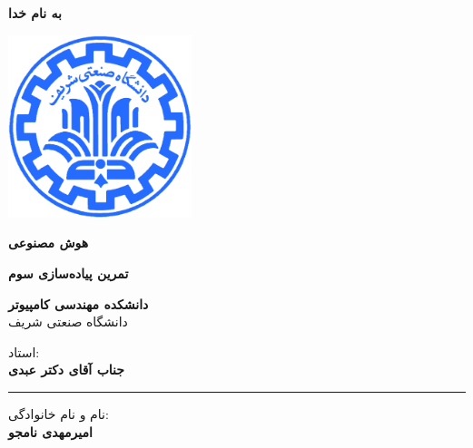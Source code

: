 \documentclass[12pt,titlepage,a4page , tikz , multi,table , svgnames,xcdraw]{article}
\begin{document}
\begin{titlepage}

 \begin{center}
        
       \vspace*{1cm}

 \vspace{1cm}
       \textbf{ \Huge{به نام خدا} }
       \vspace{0.4cm}
       
       \includegraphics[width=0.4\textwidth]{sharif1.png}
       
 	\vspace{0.7cm}
       \textbf{ \LARGE{هوش مصنوعی} }

 
   \vspace{0.7cm}
  \textbf{ \Large{ تمرین پیاده‌سازی سوم} }
   \vspace{0.5cm}
       
 
      \large \textbf{دانشکده مهندسی کامپیوتر}\\\vspace{0.2cm}
    \large   دانشگاه صنعتی شریف\\\vspace{0.25cm}
      
استاد:\\
    \textbf{{جناب آقای دکتر عبدی}}

    \vspace{0.25cm}
    \noindent\rule[1ex]{\linewidth}{3pt}
    
    \vspace{0.5cm}
نام و نام خانوادگی:\\
    \textbf{{امیرمهدی نامجو}}
        \vspace{0.1cm}

\end{center}
\end{titlepage}

\newpage
\pagestyle{fancy}
\fancyhf{}
\fancyfoot{}

\cfoot{\thepage}
\end{document}
